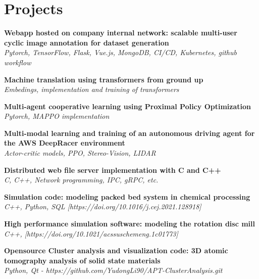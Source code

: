 \section{Projects}
\resumeSubHeadingListStart

    \resumeProjectHeading
    {\textbf{Webapp hosted on company internal network: scalable multi-user cyclic image annotation for dataset generation} \\
     \emph{Pytorch, TensorFlow, Flask, Vue.js, MongoDB, CI/CD, Kubernetes, github workflow}}    {}

    \resumeProjectHeading
    {\textbf{Machine translation using transformers from ground up} \\
      \emph{Embedings, implementation and training of transformers}}    {}

    \resumeProjectHeading
    {\textbf{Multi-agent cooperative learning using Proximal Policy Optimization} \\
      \emph{Pytorch, MAPPO implementation}}    {}

    \resumeProjectHeading
    {\textbf{Multi-modal learning and training of an autonomous driving agent for the AWS DeepRacer environment} \\
      \emph{Actor-critic models, PPO, Stereo-Vision, LIDAR}}    {}

     \resumeProjectHeading
     {\textbf{Distributed web file server implementation with C and C++} \\
      \emph{C, C++, Network programming, IPC, gRPC, etc.}}    {}
     
    \resumeProjectHeading
    {\textbf{Simulation code: modeling packed bed system in chemical processing} \\
     \emph{C++, Python, SQL [https://doi.org/10.1016/j.cej.2021.128918]}}    {}
    
    \resumeProjectHeading
    {\textbf{High performance simulation software: modeling the rotation disc mill}\\
    \emph{C++, [https://doi.org/10.1021/acssuschemeng.1c01773]}}{}

    \resumeProjectHeading
    {\textbf{Opensource Cluster analysis and visualization code: 3D atomic tomography analysis of solid state materials}\\
    \emph{Python, Qt   - https://github.com/YudongLi90/APT-ClusterAnalysis.git}} 
    

\resumeSubHeadingListEnd